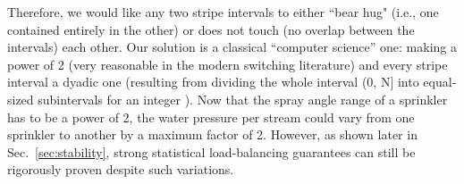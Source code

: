 Therefore, we would like any two stripe intervals to either ``bear hug"
(i.e., one contained entirely in the other) or does not touch (no overlap between the intervals) 
each other.  Our solution is a classical ``computer science'' one: making  a power of 2 (very reasonable 
in the modern switching literature) and every stripe interval a dyadic one (resulting from dividing the 
whole interval (0, N] into  equal-sized subintervals for an integer ).  
Now that the spray angle range of a sprinkler has 
to be a power of 2, the water pressure per stream could vary from one sprinkler to another by a maximum factor of 2.  
However, as shown later in Sec.~\ref{sec:stability},
strong statistical load-balancing guarantees can still be rigorously proven
despite such variations.



\begin{comment}
We will show this coordination can be mathematically characterized as an Orthogonal Latin Square (OLS).  
While how to generate a (strongly) random OLS has been an open problem in combinatorics and theoretical computer science for 
decades, we fortunately are able to circumvent it, because Sprinklers will provably work with 
a weakly random (defined later) OLS, which is 
straightforward to generate.
\end{comment}

 




\begin{comment}
With near-perfect load-balancing, a Sprinklers switch pays only a modest price for guaranteeing correct packet
order.   While all other load-balanced switching solutions can guarantee 100\% throughput, the achievable throughput of our approach
is slightly less than 100\%.
For example, in a  switch, it can be rigorously proven that our solutions can 
achieve a throughput of about 95\% with high probability; see Table~\ref{tbl:example of bounds} in 
Sec.~\ref{sec:stability} for details.  And since there are slacks in the involved
mathematical inequalities, the actual achievable throughput is likely much closer to 100\%.   

Moreover, we will show that the provably achievable throughput of our solutions approaches
100\% asymptotically as the size of the switch  increases.
This is because the load balancing capability of our solution, closely related to its throughput guarantee, 
builds upon the statistical multiplexing of flows that come from 
different input ports going to different output ports, in any intermediate ports, and this statistical multiplexing gain
grows with the number of input/output ports.  
We will show that, compared with existing load-balanced switching solutions,
each of which has to pay in one way or another for guaranteeing packet ordering,
the price paid by our solution, namely a few percent in throughput, appears to be the lowest.
\end{comment}











